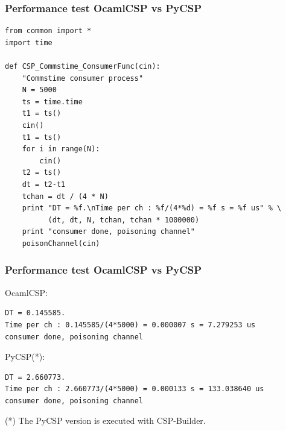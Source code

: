 \documentclass{beamer}
\begin{document}
\begin{frame}[fragile]
  \frametitle{Performance test OcamlCSP vs PyCSP}
  \tiny
\begin{verbatim}
from common import *
import time

def CSP_Commstime_ConsumerFunc(cin):
    "Commstime consumer process"
    N = 5000
    ts = time.time
    t1 = ts()
    cin()
    t1 = ts()
    for i in range(N):
        cin()
    t2 = ts()
    dt = t2-t1
    tchan = dt / (4 * N)
    print "DT = %f.\nTime per ch : %f/(4*%d) = %f s = %f us" % \
          (dt, dt, N, tchan, tchan * 1000000)
    print "consumer done, poisoning channel"
    poisonChannel(cin)
\end{verbatim}
  \normalsize
\end{frame}

\begin{frame}[fragile]
  \frametitle{Performance test OcamlCSP vs PyCSP}
OcamlCSP:
\tiny
\begin{verbatim}
DT = 0.145585.
Time per ch : 0.145585/(4*5000) = 0.000007 s = 7.279253 us
consumer done, poisoning channel
\end{verbatim}
\normalsize
PyCSP(*):
\tiny
\begin{verbatim}
DT = 2.660773.
Time per ch : 2.660773/(4*5000) = 0.000133 s = 133.038640 us
consumer done, poisoning channel
\end{verbatim}
\normalsize
(*) The PyCSP version is executed with CSP-Builder.
\end{frame}
\end{document}
